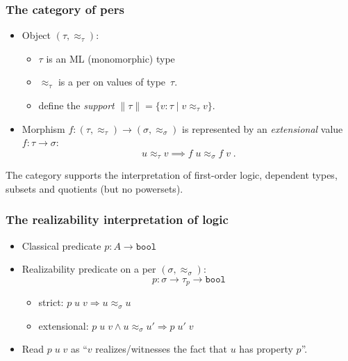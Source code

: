 \documentclass[compress,t]{beamer}
\newcommand{\per}{\approx}
\begin{document}
\begin{frame}
  \frametitle{The category of pers}

  \begin{itemize}

  \item Object $(\tau, {\per_\tau})$:
    \begin{itemize}
    \item $\tau$ is an ML (monomorphic) type
    \item $\per_\tau$ is a per on values of type~$\tau$.
    \item define the \emph{support} $\|\tau\| = \{v : \tau \mid v
      \per_\tau v \}$.
    \end{itemize}
  \item Morphism $f : (\tau, {\per_\tau}) \to (\sigma, {\per_\sigma})$
    is represented by an \emph{extensional} value $f : \tau \to \sigma$:
    \begin{equation*}
      u \per_\tau v \implies f\; u \per_\sigma f\; v \;.
    \end{equation*}
  \end{itemize}  

  The category supports the interpretation of first-order logic,
  dependent types, subsets and quotients (but no powersets).

\end{frame}

\begin{frame}
  \frametitle{The realizability interpretation of logic}

  \begin{itemize}
  \item<1-> Classical predicate $p : A \to \mathtt{bool}$
  \item<2-> Realizability predicate on a per $(\sigma, {\per_\sigma})$:
    \begin{equation*}
      p : \sigma \to \tau_p \to \mathtt{bool}
    \end{equation*}
    \begin{itemize}
    \item strict: $p\;u\;v \Rightarrow u \per_{\sigma} u$
    \item extensional: $p\;u\;v \land u \per_\sigma u' \Rightarrow p\;u'\;v$
    \end{itemize}
  \item<3-> Read $p\;u\;v$ as ``$v$ realizes/witnesses the fact that $u$ has
    property $p$''.
  \end{itemize}
\end{frame}
\end{document}
